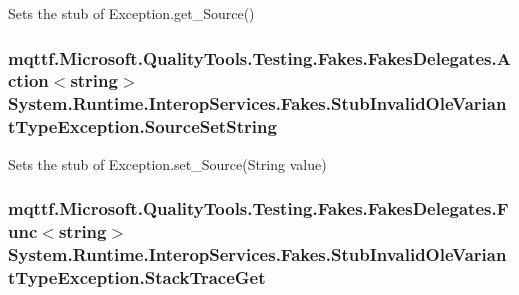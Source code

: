 Sets the stub of Exception.\-get\-\_\-\-Source()

\hypertarget{class_system_1_1_runtime_1_1_interop_services_1_1_fakes_1_1_stub_invalid_ole_variant_type_exception_a5e8a81d09435797db9a0e0e35f9baa2f}{
\subsubsection[{Source\-Set\-String}]{\setlength{\rightskip}{0pt plus 5cm}mqttf.\-Microsoft.\-Quality\-Tools.\-Testing.\-Fakes.\-Fakes\-Delegates.\-Action$<$string$>$ System.\-Runtime.\-Interop\-Services.\-Fakes.\-Stub\-Invalid\-Ole\-Variant\-Type\-Exception.\-Source\-Set\-String}}\label{class_system_1_1_runtime_1_1_interop_services_1_1_fakes_1_1_stub_invalid_ole_variant_type_exception_a5e8a81d09435797db9a0e0e35f9baa2f}


Sets the stub of Exception.\-set\-\_\-\-Source(\-String value)

\hypertarget{class_system_1_1_runtime_1_1_interop_services_1_1_fakes_1_1_stub_invalid_ole_variant_type_exception_af770c8ec7914a4d7e9a2821168c84481}{
\subsubsection[{Stack\-Trace\-Get}]{\setlength{\rightskip}{0pt plus 5cm}mqttf.\-Microsoft.\-Quality\-Tools.\-Testing.\-Fakes.\-Fakes\-Delegates.\-Func$<$string$>$ System.\-Runtime.\-Interop\-Services.\-Fakes.\-Stub\-Invalid\-Ole\-Variant\-Type\-Exception.\-Stack\-Trace\-Get}}\label{class_system_1_1_runtime_1_1_interop_services_1_1_fakes_1_1_stub_invalid_ole_variant_type_exception_af770c8ec7914a4d7e9a2821168c84481}


